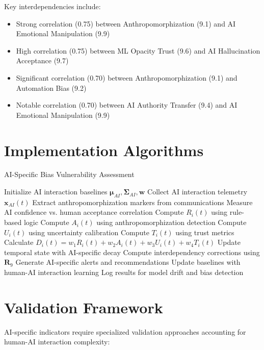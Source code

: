 \documentclass[11pt,a4paper]{article}
\begin{document}
Key interdependencies include:
\begin{itemize}
\item Strong correlation (0.75) between Anthropomorphization (9.1) and AI Emotional Manipulation (9.9)
\item High correlation (0.75) between ML Opacity Trust (9.6) and AI Hallucination Acceptance (9.7)
\item Significant correlation (0.70) between Anthropomorphization (9.1) and Automation Bias (9.2)
\item Notable correlation (0.70) between AI Authority Transfer (9.4) and AI Emotional Manipulation (9.9)
\end{itemize}

\section{Implementation Algorithms}

\begin{algorithm}
\caption{AI-Specific Bias Vulnerability Assessment}
\begin{algorithmic}[1]
\STATE Initialize AI interaction baselines $\boldsymbol{\mu}_{AI}, \boldsymbol{\Sigma}_{AI}, \boldsymbol{w}$
    \STATE Collect AI interaction telemetry $\mathbf{x}_{AI}(t)$
    \STATE Extract anthropomorphization markers from communications
    \STATE Measure AI confidence vs. human acceptance correlation
        \STATE Compute $R_i(t)$ using rule-based logic
        \STATE Compute $A_i(t)$ using anthropomorphization detection
        \STATE Compute $U_i(t)$ using uncertainty calibration
        \STATE Compute $T_i(t)$ using trust metrics
        \STATE Calculate $D_i(t) = w_1 R_i(t) + w_2 A_i(t) + w_3 U_i(t) + w_4 T_i(t)$
        \STATE Update temporal state with AI-specific decay
    \ENDFOR
    \STATE Compute interdependency corrections using $\mathbf{R}_9$
    \STATE Generate AI-specific alerts and recommendations
    \STATE Update baselines with human-AI interaction learning
    \STATE Log results for model drift and bias detection
\ENDFOR
\end{algorithmic}
\end{algorithm}

\section{Validation Framework}

AI-specific indicators require specialized validation approaches accounting for human-AI interaction complexity:
\end{document}
